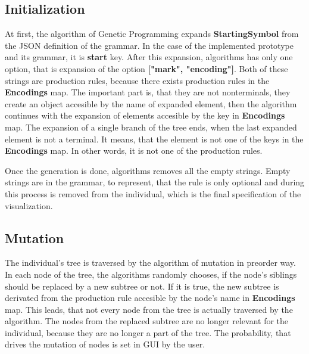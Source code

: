 \clearpage
  \subsection{Initialization}
  At first, the algorithm of Genetic Programming expands \textbf{StartingSymbol} from the JSON definition of the grammar. In the case of the implemented prototype and its grammar, it is \textbf{start} key. After this expansion, algorithms has only one option, that is expansion of the option \textbf{["mark", "encoding"]}. Both of these strings are production rules, because there exists production rules in the \textbf{Encodings} map. The important part is, that they are not nonterminals, they create an object accesible by the name of expanded element, then the algorithm continues with the expansion of elements accesible by the key in \textbf{Encodings} map. The expansion of a single branch of the tree ends, when the last expanded element is not a terminal. It means, that the element is not one of the keys in the \textbf{Encodings} map. In other words, it is not one of the production rules.

  Once the generation is done, algorithms removes all the empty strings. Empty strings are in the grammar, to represent, that the rule is only optional and during this process is removed from the individual, which is the final specification of the visualization.
  \subsection{Mutation}
  The individual's tree is traversed by the algorithm of mutation in preorder way. In each node of the tree, the algorithms randomly chooses, if the node's siblings should be replaced by a new subtree or not. If it is true, the new subtree is derivated from the production rule accesible by the node's name in \textbf{Encodings} map. This leads, that not every node from the tree is actually traversed by the algorithm. The nodes from the replaced subtree are no longer relevant for the individual, because they are no longer a part of the tree. The probability, that drives the mutation of nodes is set in GUI by the user.
